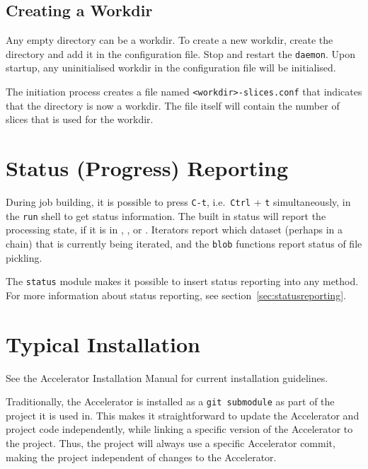 \subsection{Creating a Workdir}
Any empty directory can be a workdir.  To create a new workdir, create
the directory and add it in the configuration file.  Stop and restart
the \texttt{daemon}.  Upon startup, any uninitialised workdir in the
configuration file will be initialised.

The initiation process creates a file named
\texttt{<workdir>-slices.conf} that indicates that the directory is
now a workdir.  The file itself will contain the number of slices that
is used for the workdir.







\section{Status (Progress) Reporting}

During job building, it is possible to press \texttt{C-t},
i.e.\ \texttt{Ctrl} + \texttt{t} simultaneously, in the \texttt{run}
shell to get status information.  The built in status will report the
processing state, if it is in \prepare, \analysis, or \synthesis.
Iterators report which dataset (perhaps in a chain) that is currently
being iterated, and the \texttt{blob} functions report status of file
pickling.

The \texttt{status} module makes it possible to insert
status reporting into any method.  For more information about status
reporting, see section~\ref{sec:statusreporting}.





\section{Typical Installation}

See the Accelerator Installation Manual for current installation
guidelines.

Traditionally, the Accelerator is installed as a \texttt{git
submodule} as part of the project it is used in.  This makes it
straightforward to update the Accelerator and project code
independently, while linking a specific version of the Accelerator to
the project.  Thus, the project will always use a specific Accelerator
commit, making the project independent of changes to the Accelerator.

